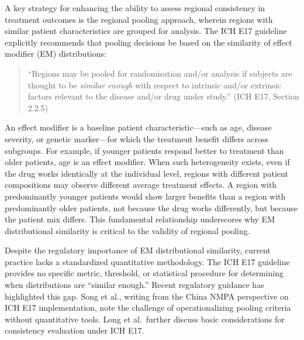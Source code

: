 \documentclass[AMA,Times1COL]{WileyNJDv5}
\begin{document}
A key strategy for enhancing the ability to assess regional consistency in treatment outcomes is the regional pooling approach, wherein regions with similar patient characteristics are grouped for analysis.\cite{iche17} The ICH E17 guideline explicitly recommends that pooling decisions be based on the similarity of effect modifier (EM) distributions:

\begin{quote}
``Regions may be pooled for randomisation and/or analysis if subjects are thought to be \emph{similar enough} with respect to intrinsic and/or extrinsic factors relevant to the disease and/or drug under study.'' (ICH E17, Section 2.2.5)
\end{quote}

An effect modifier is a baseline patient characteristic---such as age, disease severity, or genetic marker---for which the treatment benefit differs across subgroups. For example, if younger patients respond better to treatment than older patients, age is an effect modifier. When such heterogeneity exists, even if the drug works identically at the individual level, regions with different patient compositions may observe different average treatment effects. A region with predominantly younger patients would show larger benefits than a region with predominantly older patients, not because the drug works differently, but because the patient mix differs. This fundamental relationship underscores why EM distributional similarity is critical to the validity of regional pooling.

Despite the regulatory importance of EM distributional similarity, current practice lacks a standardized quantitative methodology. The ICH E17 guideline provides no specific metric, threshold, or statistical procedure for determining when distributions are ``similar enough.'' Recent regulatory guidance has highlighted this gap. Song et al., writing from the China NMPA perspective on ICH E17 implementation, note the challenge of operationalizing pooling criteria without quantitative tools.\cite{song2025} Long et al.\ further discuss basic considerations for consistency evaluation under ICH E17.\cite{long2025}
\end{document}
